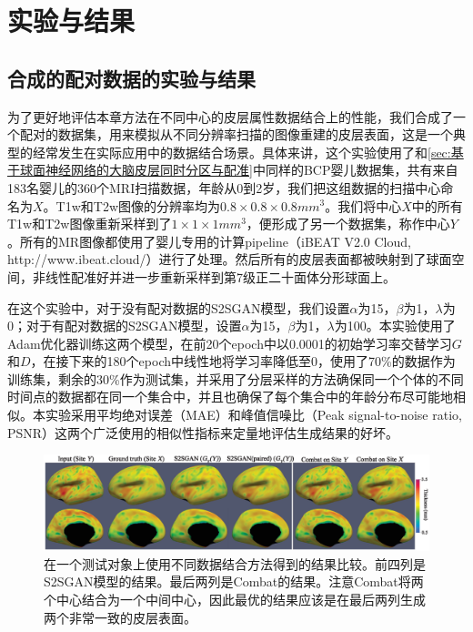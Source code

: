 	

\section{实验与结果}

\subsection{合成的配对数据的实验与结果}\label{sec:Synthetic}
为了更好地评估本章方法在不同中心的皮层属性数据结合上的性能，我们合成了一个配对的数据集，用来模拟从不同分辨率扫描的图像重建的皮层表面，这是一个典型的经常发生在实际应用中的数据结合场景。具体来讲，这个实验使用了和\ref{sec:基于球面神经网络的大脑皮层同时分区与配准}中同样的BCP\cite{howell2019unc}婴儿数据集，共有来自183名婴儿的360个MRI扫描数据，年龄从0到2岁，我们把这组数据的扫描中心命名为$X$。T1w和T2w图像的分辨率均为$0.8\times 0.8\times 0.8mm^3$。我们将中心$X$中的所有T1w和T2w图像重新采样到了$1\times 1\times 1mm^3$，便形成了另一个数据集，称作中心$Y$。所有的MR图像都使用了婴儿专用的计算pipeline（iBEAT V2.0 Cloud, http://www.ibeat.cloud/）进行了处理。然后所有的皮层表面都被映射到了球面空间，非线性配准好并进一步重新采样到第7级正二十面体分形球面上。

在这个实验中，对于没有配对数据的S2SGAN模型，我们设置$\alpha$为15，$\beta$为1，$\lambda$为0；对于有配对数据的S2SGAN模型，设置$\alpha$为15，$\beta$为1，$\lambda$为100。本实验使用了Adam优化器训练这两个模型，在前20个epoch中以0.0001的初始学习率交替学习$G$和$D$，在接下来的180个epoch中线性地将学习率降低至0，使用了70\%的数据作为训练集，剩余的30\%作为测试集，并采用了分层采样的方法确保同一个个体的不同时间点的数据都在同一个集合中，并且也确保了每个集合中的年龄分布尽可能地相似。本实验采用平均绝对误差（MAE）和峰值信噪比（Peak signal-to-noise ratio, PSNR）这两个广泛使用的相似性指标来定量地评估生成结果的好坏。

\begin{figure}[h]
	\centering
	\includegraphics[width=\linewidth]{figure/s2sgan_paired_result.eps}
	\caption{在一个测试对象上使用不同数据结合方法得到的结果比较。前四列是S2SGAN模型的结果。最后两列是Combat的结果。注意Combat将两个中心结合为一个中间中心，因此最优的结果应该是在最后两列生成两个非常一致的皮层表面。}\label{fig:s2sgan_paired_result} 
\end{figure} 

